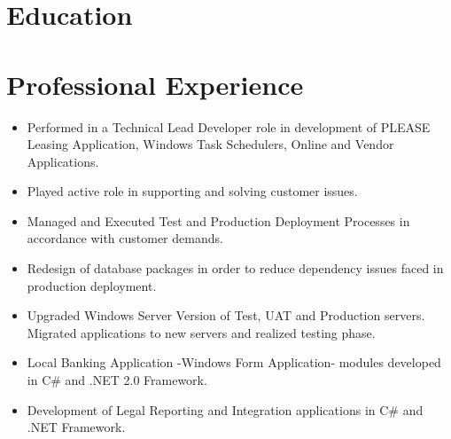 \documentclass[1pt,a4paper,verdana]{moderncv} %
\title{}
\begin{document}
\makecvtitle %




\section{Education}



\section{Professional Experience}
	{
		\begin{itemize}
		\item Performed in a Technical Lead Developer role in development of PLEASE Leasing Application, Windows Task Schedulers, Online and Vendor Applications.
		\item Played active role in supporting and solving customer issues.
		\item Managed and Executed Test and Production Deployment Processes in accordance with customer demands.
		\item Redesign of database packages in order to reduce dependency issues faced in production deployment.		
		\item Upgraded Windows Server Version of Test, UAT and Production servers. Migrated applications to new servers and realized testing phase.
\end{itemize}}		
	{
		\begin{itemize}
		\item Local Banking Application -Windows Form Application- modules developed in C\# and .NET 2.0 Framework. 
		\item Development of Legal Reporting and Integration applications in C\# and .NET Framework.
\end{itemize}}
\end{document}
